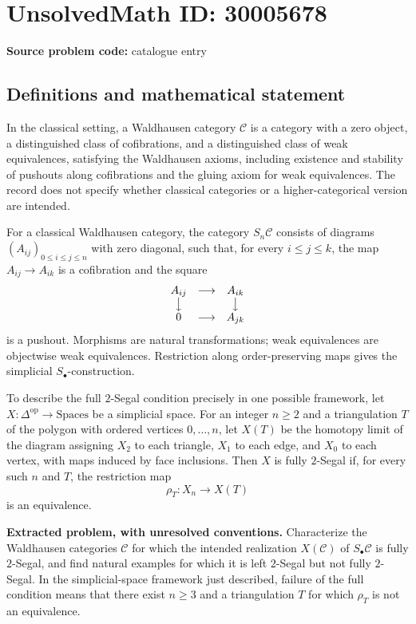 \documentclass[11pt]{article}
\begin{document}
\section*{UnsolvedMath ID: 30005678}
\textbf{Source problem code:} catalogue entry
\subsection{Definitions and mathematical statement}
In the classical setting, a Waldhausen category \(\mathcal C\) is a category with a zero object, a distinguished class of cofibrations, and a distinguished class of weak equivalences, satisfying the Waldhausen axioms, including existence and stability of pushouts along cofibrations and the gluing axiom for weak equivalences. The record does not specify whether classical categories or a higher-categorical version are intended.

For a classical Waldhausen category, the category \(S_n\mathcal C\) consists of diagrams \((A_{ij})_{0\leq i\leq j\leq n}\) with zero diagonal, such that, for every \(i\leq j\leq k\), the map \(A_{ij}\to A_{ik}\) is a cofibration and the square
\[
\begin{matrix}
A_{ij}&\longrightarrow&A_{ik}\\
\big\downarrow&&\big\downarrow\\
0&\longrightarrow&A_{jk}
\end{matrix}
\]
is a pushout. Morphisms are natural transformations; weak equivalences are objectwise weak equivalences. Restriction along order-preserving maps gives the simplicial \(S_\bullet\)-construction.

To describe the full \(2\)-Segal condition precisely in one possible framework, let \(X\colon\Delta^{\mathrm{op}}\to\mathrm{Spaces}\) be a simplicial space. For an integer \(n\geq2\) and a triangulation \(T\) of the polygon with ordered vertices \(0,\ldots,n\), let \(X(T)\) be the homotopy limit of the diagram assigning \(X_2\) to each triangle, \(X_1\) to each edge, and \(X_0\) to each vertex, with maps induced by face inclusions. Then \(X\) is fully \(2\)-Segal if, for every such \(n\) and \(T\), the restriction map
\[
\rho_T\colon X_n\longrightarrow X(T)
\]
is an equivalence.

\textbf{Extracted problem, with unresolved conventions.} Characterize the Waldhausen categories \(\mathcal C\) for which the intended realization \(X(\mathcal C)\) of \(S_\bullet\mathcal C\) is fully \(2\)-Segal, and find natural examples for which it is left \(2\)-Segal but not fully \(2\)-Segal. In the simplicial-space framework just described, failure of the full condition means that there exist \(n\geq3\) and a triangulation \(T\) for which \(\rho_T\) is not an equivalence.
\end{document}
